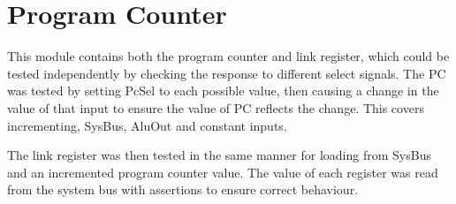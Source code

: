 
\section{Program Counter}


This module contains both the program counter and link register, which could be tested independently by checking the response to different select signals. The PC was tested by setting PcSel to each possible value, then causing a change in the value of that input to ensure the value of PC reflects the change. This covers incrementing, SysBus, AluOut and constant inputs. 

The link register was then tested in the same manner for loading from SysBus and an incremented program counter value. The value of each register was read from the system bus with assertions to ensure correct behaviour. 


